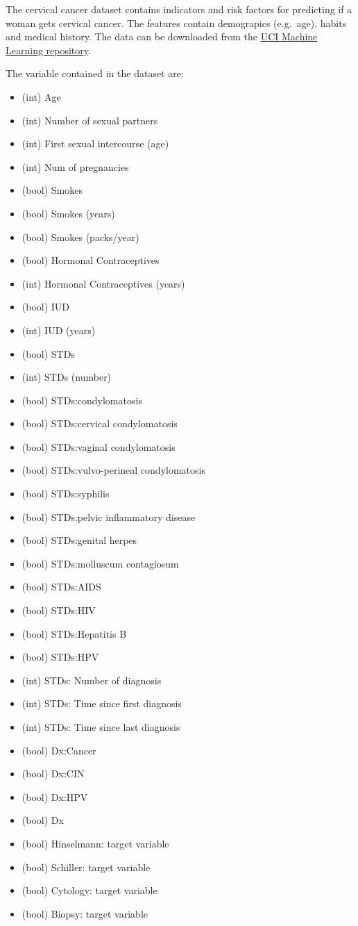 \documentclass[12pt,]{krantz}
\providecommand{\tightlist}{%
  \setlength{\itemsep}{0pt}\setlength{\parskip}{0pt}}
\theoremstyle{definition}
\theoremstyle{definition}
\theoremstyle{definition}
\theoremstyle{remark}
\begin{document}
The cervical cancer dataset contains indicators and risk factors for
predicting if a woman gets cervical cancer. The features contain
demograpics (e.g.~age), habits and medical history. The data can be
downloaded from the
\href{https://archive.ics.uci.edu/ml/datasets/Cervical+cancer+\%28Risk+Factors\%29}{UCI
Machine Learning repository}.

The variable contained in the dataset are:

\begin{itemize}
\tightlist
\item
  (int) Age
\item
  (int) Number of sexual partners
\item
  (int) First sexual intercourse (age)
\item
  (int) Num of pregnancies
\item
  (bool) Smokes
\item
  (bool) Smokes (years)
\item
  (bool) Smokes (packs/year)
\item
  (bool) Hormonal Contraceptives
\item
  (int) Hormonal Contraceptives (years)
\item
  (bool) IUD
\item
  (int) IUD (years)
\item
  (bool) STDs
\item
  (int) STDs (number)
\item
  (bool) STDs:condylomatosis
\item
  (bool) STDs:cervical condylomatosis
\item
  (bool) STDs:vaginal condylomatosis
\item
  (bool) STDs:vulvo-perineal condylomatosis
\item
  (bool) STDs:syphilis
\item
  (bool) STDs:pelvic inflammatory disease
\item
  (bool) STDs:genital herpes
\item
  (bool) STDs:molluscum contagiosum
\item
  (bool) STDs:AIDS
\item
  (bool) STDs:HIV
\item
  (bool) STDs:Hepatitis B
\item
  (bool) STDs:HPV
\item
  (int) STDs: Number of diagnosis
\item
  (int) STDs: Time since first diagnosis
\item
  (int) STDs: Time since last diagnosis
\item
  (bool) Dx:Cancer
\item
  (bool) Dx:CIN
\item
  (bool) Dx:HPV
\item
  (bool) Dx
\item
  (bool) Hinselmann: target variable
\item
  (bool) Schiller: target variable
\item
  (bool) Cytology: target variable
\item
  (bool) Biopsy: target variable
\end{itemize}
\end{document}
